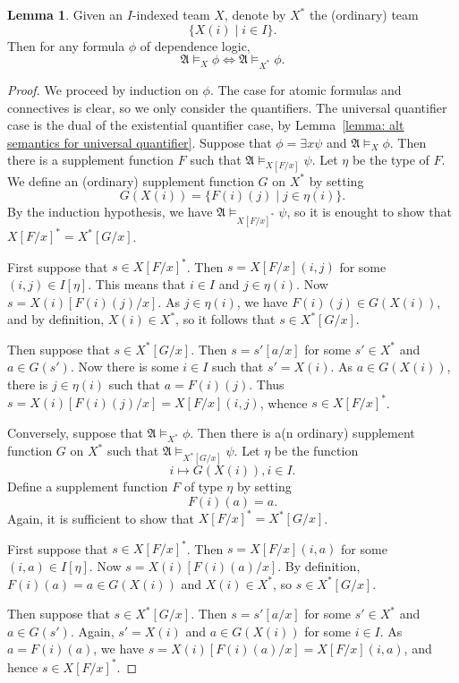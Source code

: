 \documentclass[12pt]{article}
\theoremstyle{definition}
\newtheorem{lemma}[definition]{Lemma}
\newcommand{\A}{\mathfrak{A}}
\begin{document}
\begin{lemma}\label{lemma: indexing does not change semantics}
    Given an $I$-indexed team $X$, denote by $X^*$ the (ordinary) team
    \[
        \{ X(i) \mid i\in I \}.
    \]
    Then for any formula $\phi$ of dependence logic,
    \[
        \A\models_X\phi \iff \A\models_{X^*}\phi.
    \]
\end{lemma}
\begin{proof}
    We proceed by induction on $\phi$. The case for atomic formulas and connectives is clear, so we only consider the quantifiers. The universal quantifier case is the dual of the existential quantifier case, by Lemma~\ref{lemma: alt semantics for universal quantifier}. Suppose that $\phi = \exists x\psi$ and $\A\models_X\phi$. Then there is a supplement function $F$ such that $\A\models_{X[F/x]}\psi$. Let $\eta$ be the type of $F$. We define an (ordinary) supplement function $G$ on $X^*$ by setting
    \[
        G(X(i)) = \{ F(i)(j) \mid j\in\eta(i) \}.
    \]
    By the induction hypothesis, we have $\A\models_{X[F/x]^*}\psi$, so it is enought to show that $X[F/x]^* = X^*[G/x]$.
    
    First suppose that $s\in X[F/x]^*$. Then $s = X[F/x](i,j)$ for some $(i,j)\in I[\eta]$. This means that $i\in I$ and $j\in\eta(i)$. Now $s = X(i)[F(i)(j)/x]$. As $j\in\eta(i)$, we have $F(i)(j)\in G(X(i))$, and by definition, $X(i)\in X^*$, so it follows that $s\in X^*[G/x]$.

    Then suppose that $s\in X^*[G/x]$. Then $s = s'[a/x]$ for some $s'\in X^*$ and $a\in G(s')$. Now there is some $i\in I$ such that $s' = X(i)$. As $a\in G(X(i))$, there is $j\in\eta(i)$ such that $a = F(i)(j)$. Thus $s = X(i)[F(i)(j)/x] = X[F/x](i,j)$, whence $s\in X[F/x]^*$.

    Conversely, suppose that $\A\models_{X^*}\phi$. Then there is a(n ordinary) supplement function $G$ on $X^*$ such that $\A\models_{X^*[G/x]}\psi$. Let $\eta$ be the function
    \[
        i\mapsto G(X(i)), i\in I.
    \]
    Define a supplement function $F$ of type $\eta$ by setting
    \[
        F(i)(a) = a.
    \]
    Again, it is sufficient to show that $X[F/x]^* = X^*[G/x]$.

    First suppose that $s\in X[F/x]^*$. Then $s = X[F/x](i,a)$ for some $(i,a)\in I[\eta]$. Now $s = X(i)[F(i)(a)/x]$. By definition, $F(i)(a) = a\in G(X(i))$ and $X(i)\in X^*$, so $s\in X^*[G/x]$.

    Then suppose that $s\in X^*[G/x]$. Then $s = s'[a/x]$ for some $s'\in X^*$ and $a\in G(s')$. Again, $s' = X(i)$ and $a\in G(X(i))$ for some $i\in I$. As $a = F(i)(a)$, we have $s = X(i)[F(i)(a)/x] = X[F/x](i,a)$, and hence $s\in X[F/x]^*$.
\end{proof}
\end{document}
